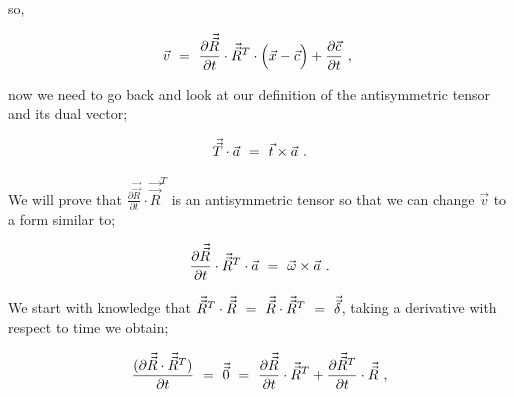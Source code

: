 \documentclass{article}
\begin{document}
so,

\begin{equation} \label{eq:1}
\vec{v} \hspace{0.125cm} = \hspace{0.125cm} \frac{\partial{\vec{\vec{R}}}}{\partial{t}} \cdot  \vec{\vec{R}}^{T} \cdot \Big( \vec{x} - \vec{c} \Big) + \frac{\partial{\vec{c}}}{\partial{t}} \hspace{0.125cm}  ,  \hspace{0.125cm} 
\end{equation}

now we need to go back and look at our definition of the antisymmetric tensor and its dual vector;

\begin{equation} \label{eq:1}
\vec{\vec{T}} \cdot \vec{a} \hspace{0.125cm} = \hspace{0.125cm} \vec{t} \times \vec{a} \hspace{0.125cm} . 
\end{equation}

We will prove that \begin{math} \frac{\partial{\vec{\vec{R}}}}{\partial{t}} \cdot  \vec{\vec{R}}^{T} \end{math} is an antisymmetric tensor so that we can change \begin{math} \vec{v} \end{math} to a form similar to;

\begin{equation} \label{eq:1}
\frac{\partial{\vec{\vec{R}}}}{\partial{t}} \cdot  \vec{\vec{R}}^{T} \cdot \vec{a} \hspace{0.125cm} = \hspace{0.125cm} \vec{\omega} \times \vec{a} \hspace{0.125cm} . 
\end{equation}

We start with knowledge that \begin{math} \vec{\vec{R}}^{T} \cdot \vec{\vec{R}} \hspace{0.125cm} = \hspace{0.125cm} \vec{\vec{R}} \cdot \vec{\vec{R}}^{T} \hspace{0.125cm} = \hspace{0.125cm} \vec{\vec{\delta}} \end{math}, taking a derivative with respect to time we obtain;

\begin{equation} \label{eq:1}
\frac{(\partial{\vec{\vec{R}} \cdot \vec{\vec{R}}^{T}})}{\partial{t}} \hspace{0.125cm} = \hspace{0.125cm} \vec{\vec{0}} \hspace{0.125cm} = \hspace{0.125cm} \frac{\partial{\vec{\vec{R}}}}{\partial{t}} \cdot  \vec{\vec{R}}^{T} + \frac{\partial{\vec{\vec{R}}^{T}}}{\partial{t}} \cdot  \vec{\vec{R}}\hspace{0.125cm} ,
\end{equation}
\end{document}
